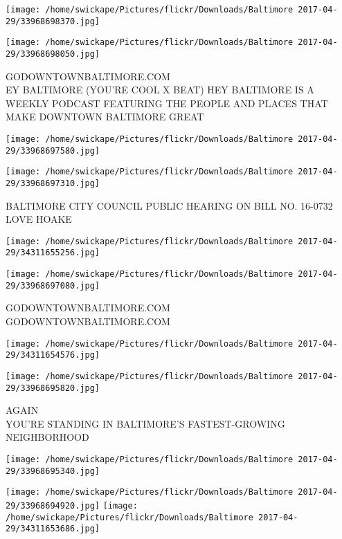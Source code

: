 \documentclass[10pt,letterpaper]{article}
\begin{document}
\texttt{[image: /home/swickape/Pictures/flickr/Downloads/Baltimore 2017-04-29/33968698370.jpg]}

\vspace{0.25in}
\texttt{[image: /home/swickape/Pictures/flickr/Downloads/Baltimore 2017-04-29/33968698050.jpg]}

GODOWNTOWNBALTIMORE.COM\\
EY BALTIMORE (YOU'RE COOL X BEAT) HEY BALTIMORE IS A WEEKLY PODCAST FEATURING THE PEOPLE AND PLACES THAT MAKE DOWNTOWN BALTIMORE GREAT
\pagebreak

\texttt{[image: /home/swickape/Pictures/flickr/Downloads/Baltimore 2017-04-29/33968697580.jpg]}

\vspace{0.25in}
\texttt{[image: /home/swickape/Pictures/flickr/Downloads/Baltimore 2017-04-29/33968697310.jpg]}

BALTIMORE CITY COUNCIL PUBLIC HEARING ON BILL NO. 16{-}0732\\
LOVE HOAKE
\pagebreak

\texttt{[image: /home/swickape/Pictures/flickr/Downloads/Baltimore 2017-04-29/34311655256.jpg]}

\vspace{0.25in}
\texttt{[image: /home/swickape/Pictures/flickr/Downloads/Baltimore 2017-04-29/33968697080.jpg]}

GODOWNTOWNBALTIMORE.COM\\
GODOWNTOWNBALTIMORE.COM
\pagebreak

\texttt{[image: /home/swickape/Pictures/flickr/Downloads/Baltimore 2017-04-29/34311654576.jpg]}

\vspace{0.25in}
\texttt{[image: /home/swickape/Pictures/flickr/Downloads/Baltimore 2017-04-29/33968695820.jpg]}

AGAIN\\
YOU'RE STANDING IN BALTIMORE'S FASTEST{-}GROWING NEIGHBORHOOD
\pagebreak

\texttt{[image: /home/swickape/Pictures/flickr/Downloads/Baltimore 2017-04-29/33968695340.jpg]}

\vspace{0.25in}
\texttt{[image: /home/swickape/Pictures/flickr/Downloads/Baltimore 2017-04-29/33968694920.jpg]}
\texttt{[image: /home/swickape/Pictures/flickr/Downloads/Baltimore 2017-04-29/34311653686.jpg]}
\end{document}
